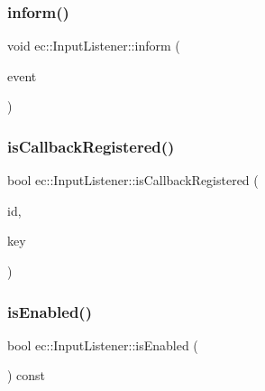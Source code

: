 \mbox{\label{classec_1_1_input_listener_a39e0803651e945e177336df2cf84d61b}} 
\subsubsection{\texorpdfstring{inform()}{inform()}}
{\footnotesize\ttfamily void ec\+::\+Input\+Listener\+::inform (\begin{DoxyParamCaption}\item[{const \mbox{\hyperlink{structec_1_1_input_event}{Input\+Event}} \&}]{event }\end{DoxyParamCaption})}

\mbox{\label{classec_1_1_input_listener_aabb55b880fb8fbc1fb6d8606ec8ca867}} 
\subsubsection{\texorpdfstring{is\+Callback\+Registered()}{isCallbackRegistered()}}
{\footnotesize\ttfamily bool ec\+::\+Input\+Listener\+::is\+Callback\+Registered (\begin{DoxyParamCaption}\item[{const std\+::string \&}]{id,  }\item[{\mbox{\hyperlink{namespaceec_a5de6bdb8c4b2ed6e590e721ec998f964}{Event\+Key\+\_\+T}}}]{key }\end{DoxyParamCaption})}

\mbox{\label{classec_1_1_input_listener_a6d7a4e04543e3a86745261d9fefcbfc1}} 
\subsubsection{\texorpdfstring{is\+Enabled()}{isEnabled()}}
{\footnotesize\ttfamily bool ec\+::\+Input\+Listener\+::is\+Enabled (\begin{DoxyParamCaption}{ }\end{DoxyParamCaption}) const\hspace{0.3cm}{\ttfamily [virtual]}}

